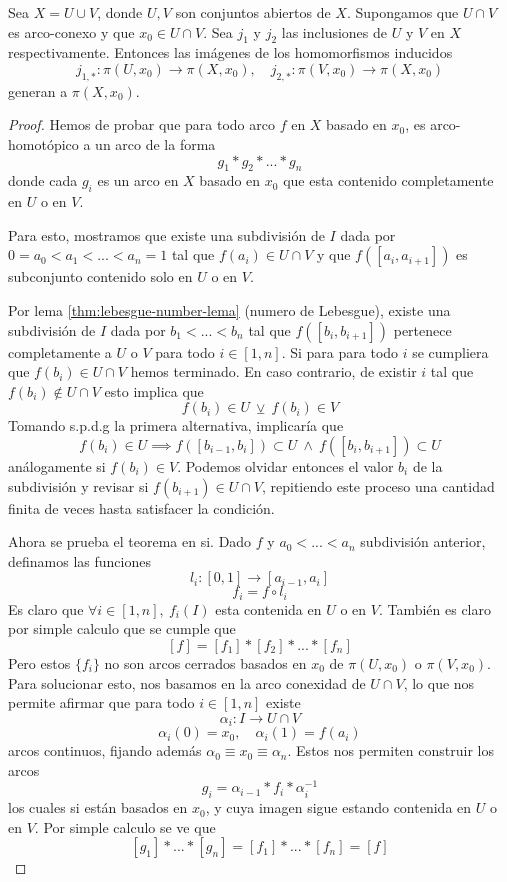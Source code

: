\begin{teorema} \label{thm:vank-especifico}
  Sea \(X = U \cup V\), donde \(U,V\) son conjuntos abiertos de \(X\).
  Supongamos que \(U \cap V\) es arco-conexo y que \(x_0 \in U \cap V\).
  Sea \(j_1\) y \(j_2\) las inclusiones de \(U\) y \(V\) en \(X\)
  respectivamente. Entonces las imágenes de los homomorfismos inducidos
  \[ j_{1,*} : \pi (U, x_0) \to \pi (X, x_0), \quad j_{2,*} : \pi
  (V, x_0) \to \pi (X, x_0) \]
  generan a \(\pi (X,x_0)\).
\end{teorema}
\begin{proof}
  Hemos de probar que para todo arco \(f\) en \(X\) basado en \(x_0\),
  es arco-homotópico a un arco de la forma
  \[ g_1 * g_2 * ... * g_n \]
  donde cada \(g_i\) es un arco en \(X\) basado en \(x_0\) que esta
  contenido completamente en \(U\) o en \(V\).

  Para esto, mostramos que existe una subdivisión de \(I\) dada por
  \(0 = a_0 < a_1 < ... < a_n = 1 \) tal que \(f(a_i) \in U \cap V\) y que \(
  f([a_i , a_{i+1}]) \) es subconjunto contenido solo en \(U\) o en
  \(V\).

  Por lema \ref{thm:lebesgue-number-lema} (numero de Lebesgue),
  existe una subdivisión de \(I\) dada por \(b_1 < ... < b_n\) tal que
  \(f ([b_i , b_{i+1}])\) pertenece completamente a \(U\) o \(V\) para
  todo \(i \in [1,n]\). Si para para todo \(i\) se cumpliera que
  \(f(b_i) \in U \cap V\) hemos terminado. En caso contrario, de existir
  \(i\) tal que \(f(b_i) \not \in U \cap V\) esto implica que
  \[ f(b_i) \in U \ \veebar \ f(b_i) \in V \]
  Tomando s.p.d.g la primera alternativa, implicaría que
  \[ f(b_i) \in U \implies f([b_{i-1}, b_{i}]) \subset U \ \land \ f([b_i,
    b_{i+1}]) \subset U \]
  análogamente si \(f(b_i) \in V\). Podemos olvidar entonces el valor
  \(b_i\) de la subdivisión y revisar si \(f(b_{i+1}) \in U \cap V\),
  repitiendo este proceso una cantidad finita de veces hasta satisfacer
  la condición.

  Ahora se prueba el teorema en si. Dado \(f\) y \(a_0 < ... < a_n\)
  subdivisión anterior, definamos las funciones
  \[ l_i : [0,1] \to [a_{i-1}, a_{i}] \]
  \[ f_i = f \circ l_i \]
  Es claro que \(\forall i \in [1, n], \ f_i (I) \) esta contenida en
  \(U\) o en \(V\). También es claro por simple calculo que se cumple
  que
  \[ [f] = [f_1] * [f_2] * ... * [f_n] \]
  Pero estos \(\{f_i\}\) no son arcos cerrados basados en \(x_0\) de
  \(\pi (U,x_0)\) o \(\pi (V,x_0)\). Para solucionar esto, nos basamos
  en la arco conexidad de \(U \cap V\), lo que nos permite afirmar que
  para todo \(i \in [1 , n]\) existe
  \[ \alpha_i : I \to U \cap V \]
  \[ \alpha_i (0) = x_0, \quad \alpha_i (1) = f(a_i) \]
  arcos continuos, fijando además \(\alpha_0 \equiv x_0 \equiv \alpha_n
  \). Estos nos permiten construir los arcos
  \[ g_i = \alpha_{i-1} * f_i * \alpha_i^{-1} \]
  los cuales si están basados en \(x_0\), y cuya imagen sigue estando
  contenida en \(U\) o en \(V\). Por simple calculo se ve que
  \[ [g_1] * ... * [g_n] = [f_1] * ... * [f_n] = [f] \]
\end{proof}
